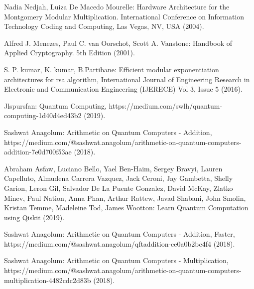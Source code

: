 \documentclass{cpp}
\begin{document}
\begin{thebibliography}{7}
Nadia Nedjah, Luiza De Macedo Mourelle: Hardware Architecture for the Montgomery Modular Multiplication. International Conference on Information Technology Coding and Computing, Las Vegas, NV, USA (2004).

Alfred J. Menezes, Paul C. van Oorschot, Scott A. Vanstone: Handbook of Applied Cryptography. 5th Edition (2001).

S. P. kumar, K. kumar, B.Partibane: Efficient modular exponentiation architectures for rsa algorithm, International Journal of Engineering Research in Electronic and Communication Engineering (IJERECE) Vol 3, Issue 5 (2016).

Jlspursfan: Quantum Computing, https://medium.com/swlh/quantum-computing-1d40d4ed43b2 (2019).

Sashwat Anagolum: Arithmetic on Quantum Computers - Addition, https://medium.com/@sashwat.anagolum/arithmetic-on-quantum-computers-addition-7e0d700f53ae (2018).

Abraham Asfaw, Luciano Bello, Yael Ben-Haim, Sergey Bravyi, Lauren Capelluto, Almudena Carrera Vazquez, Jack Ceroni, Jay Gambetta, Shelly Garion, Leron Gil, Salvador De La Puente Gonzalez, David McKay, Zlatko Minev, Paul Nation, Anna Phan, Arthur Rattew, Javad Shabani, John Smolin, Kristan Temme, Madeleine Tod, James Wootton: Learn Quantum Computation using Qiskit (2019).

Sashwat Anagolum: Arithmetic on Quantum Computers - Addition, Faster, https://medium.com/@sashwat.anagolum/qftaddition-ce0a0b2bc4f4 (2018).

Sashwat Anagolum: Arithmetic on Quantum Computers - Multiplication, https://medium.com/@sashwat.anagolum/arithmetic-on-quantum-computers-multiplication-4482cdc2d83b (2018).









\end{thebibliography}
\end{document}
